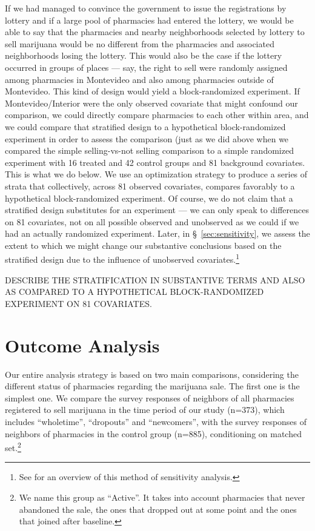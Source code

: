 \documentclass[11pt]{article}
\begin{document}
If we had managed to convince the government to issue the registrations by lottery and if a large pool of pharmacies had entered the lottery, we would be able to say that the pharmacies and nearby neighborhoods selected by lottery to sell marijuana would be no different from the pharmacies and associated neighborhoods losing the lottery. This would also be the case if the lottery occurred in groups of places --- say, the right to sell were randomly assigned among pharmacies in Montevideo and also among pharmacies outside of Montevideo. This kind of design would yield a block-randomized experiment. If Montevideo/Interior were the only observed covariate that might confound our comparison, we could directly compare pharmacies to each other within area, and we could compare that stratified design to a hypothetical block-randomized experiment in order to assess the comparison (just as we did above when we compared the simple selling-vs-not selling comparison to a simple randomized experiment with 16 treated and 42 control groups and 81 background covariates. This is what we do below. We use an optimization strategy to produce a series of strata that collectively, across 81 observed covariates, compares favorably to a hypothetical block-randomized experiment. Of course, we do not claim that a stratified design substitutes for an experiment --- we can only speak to differences on 81 covariates, not on all possible observed and unobserved as we could if we had an actually randomized experiment. Later, in \S~\ref{sec:sensitivity}, we assess the extent to which we might change our substantive conclusions based on the stratified design due to the influence of unobserved covariates.\footnote{See \citep[Chapter 3]{rosenbaum2010design} for an overview of this method of sensitivity analysis.}


DESCRIBE THE STRATIFICATION IN SUBSTANTIVE TERMS AND ALSO AS COMPARED TO A HYPOTHETICAL BLOCK-RANDOMIZED EXPERIMENT ON 81 COVARIATES.


\section{Outcome Analysis}
Our entire analysis strategy is based on two main comparisons, considering the different status of pharmacies regarding the marijuana sale. The first one is the simplest one. We compare the survey responses of neighbors of all pharmacies registered to sell marijuana in the time period of our study (n=373), which includes ``wholetime'', ``dropouts'' and ``newcomers'', with the survey responses of neighbors of pharmacies in the control group (n=885), conditioning on matched set.\footnote{We name this group as ``Active''. It takes into account pharmacies that never abandoned the sale, the ones that dropped out at some point and the ones that joined after baseline.}
\end{document}
